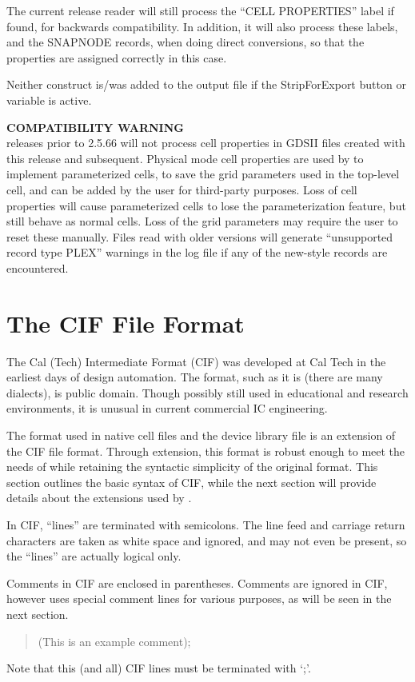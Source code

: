 The current release reader will still process the ``{\vt CELL
PROPERTIES}'' label if found, for backwards compatibility.  In
addition, it will also process these labels, and the SNAPNODE records,
when doing direct conversions, so that the properties are assigned
correctly in this case.

Neither construct is/was added to the output file if the {\et
StripForExport} button or variable is active.

{\bf COMPATIBILITY WARNING}\\
{\Xic} releases prior to 2.5.66 will not process cell properties in
GDSII files created with this release and subsequent.  Physical mode
cell properties are used by {\Xic} to implement parameterized cells,
to save the grid parameters used in the top-level cell, and can be
added by the user for third-party purposes.  Loss of cell properties
will cause parameterized cells to lose the parameterization feature,
but still behave as normal cells.  Loss of the grid parameters may
require the user to reset these manually.  Files read with older
versions will generate ``{\vt unsupported record type PLEX}'' warnings
in the log file if any of the new-style records are encountered.

\section{The CIF File Format}

The Cal (Tech) Intermediate Format (CIF) was developed at Cal Tech in
the earliest days of design automation.  The format, such as it is
(there are many dialects), is public domain.  Though possibly still
used in educational and research environments, it is unusual in
current commercial IC engineering.

The format used in native cell files and the device library file is
an extension of the CIF file format.  Through extension, this format is
robust enough to meet the needs of {\Xic} while retaining the syntactic
simplicity of the original format.  This section outlines the basic
syntax of CIF, while the next section will provide details about the
extensions used by {\Xic}.

In CIF, ``lines'' are terminated with semicolons.  The line feed and
carriage return characters are taken as white space and ignored, and
may not even be present, so the ``lines'' are actually logical only.

Comments in CIF are enclosed in parentheses.  Comments are ignored in
CIF, however {\Xic} uses special comment lines for various purposes,
as will be seen in the next section.
\begin{quote}\vt
(This is an example comment);
\end{quote}
Note that this (and all) CIF lines must be terminated with `;'.

